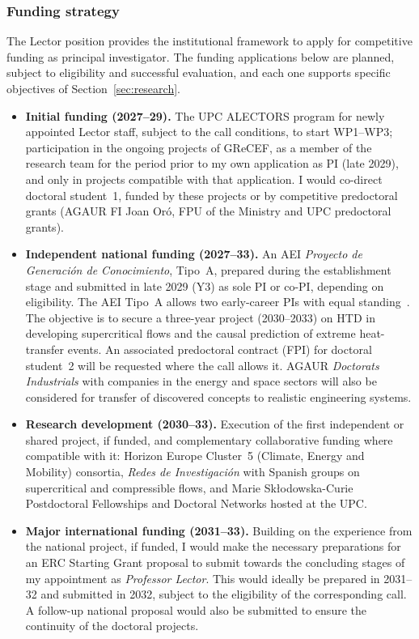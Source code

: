 \documentclass[11pt]{article}
\begin{document}
\subsubsection{Funding strategy}
The Lector position provides the institutional framework to
apply for competitive funding as principal investigator. 
The funding applications below are planned, subject to eligibility and successful evaluation, and each one supports specific objectives of Section~\ref{sec:research}.
\begin{itemize}
  \item \textbf{Initial funding (2027--29).} The UPC ALECTORS program for newly appointed Lector staff, subject to the call conditions, to start WP1--WP3; participation in the ongoing projects of GReCEF, as a member of the research team for the period prior to my own application as PI (late 2029), and only in projects compatible with that application. 
  I would co-direct doctoral student~1, funded by these projects or by competitive predoctoral grants (AGAUR FI Joan Or\'o, FPU of the Ministry and UPC predoctoral grants).
  
  \item \textbf{Independent national funding (2027--33).} An AEI \emph{Proyecto de Generaci\'on de Conocimiento}, Tipo~A, prepared during the establishment stage and submitted in late 2029 (Y3) as sole PI or co-PI, depending on eligibility. 
  The AEI Tipo~A allows two early-career PIs with equal standing~\cite{AEI2025}. 
  The objective is to secure a three-year project (2030--2033) on HTD in developing supercritical flows and the causal prediction of extreme heat-transfer events. 
  An associated predoctoral contract (FPI) for doctoral student~2 will be requested where the call allows it. 
  AGAUR \emph{Doctorats Industrials} with companies in the energy and space sectors will also be considered for transfer of discovered concepts to realistic engineering systems.
  
  \item \textbf{Research development (2030--33).} Execution of the first independent or shared project, if funded, and complementary collaborative funding where compatible with it: Horizon Europe Cluster~5 (Climate, Energy and Mobility) consortia, \emph{Redes de Investigaci\'on}   with Spanish groups on supercritical and compressible flows, and Marie Sk\l{}odowska-Curie Postdoctoral Fellowships and Doctoral Networks hosted at the UPC.
  
  \item \textbf{Major international funding (2031--33).} Building on the experience from the national project, if funded, I would make the necessary preparations for an ERC Starting Grant proposal to submit towards the concluding stages of my appointment as \textit{Professor Lector}. This would ideally be prepared in 2031--32 and submitted in 2032, subject to the eligibility of the corresponding call. A follow-up national proposal would also be submitted to ensure the continuity of the doctoral projects.
\end{itemize}
\end{document}

